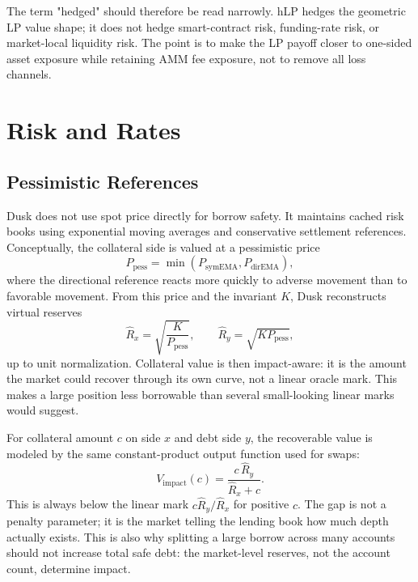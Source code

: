 \documentclass[11pt]{article}
\begin{document}
The term "hedged" should therefore be read narrowly. hLP hedges the geometric LP value shape; it does not hedge smart-contract risk, funding-rate risk, or market-local liquidity risk. The point is to make the LP payoff closer to one-sided asset exposure while retaining AMM fee exposure, not to remove all loss channels.

\section{Risk and Rates}

\subsection{Pessimistic References}

Dusk does not use spot price directly for borrow safety. It maintains cached risk books using exponential moving averages and conservative settlement references. Conceptually, the collateral side is valued at a pessimistic price
\begin{equation}
P_{\mathrm{pess}}=\min(P_{\mathrm{symEMA}},P_{\mathrm{dirEMA}}),
\end{equation}
where the directional reference reacts more quickly to adverse movement than to favorable movement. From this price and the invariant $K$, Dusk reconstructs virtual reserves
\begin{equation}
\hat R_x=\sqrt{\frac{K}{P_{\mathrm{pess}}}},\qquad
\hat R_y=\sqrt{KP_{\mathrm{pess}}},
\end{equation}
up to unit normalization. Collateral value is then impact-aware: it is the amount the market could recover through its own curve, not a linear oracle mark. This makes a large position less borrowable than several small-looking linear marks would suggest.

For collateral amount $c$ on side $x$ and debt side $y$, the recoverable value is modeled by the same constant-product output function used for swaps:
\begin{equation}
V_{\mathrm{impact}}(c)=\frac{c\,\hat R_y}{\hat R_x+c}.
\end{equation}
This is always below the linear mark $c\hat R_y/\hat R_x$ for positive $c$. The gap is not a penalty parameter; it is the market telling the lending book how much depth actually exists. This is also why splitting a large borrow across many accounts should not increase total safe debt: the market-level reserves, not the account count, determine impact.
\end{document}
